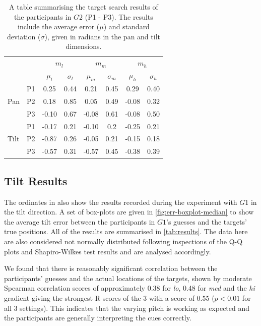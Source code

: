 \documentclass[sigconf, screen=true, anonymous=true]{acmart}
\begin{document}
\begin{table}
  \centering
  \caption{A table summarising the target search results of the participants in $G2$ (P1 - P3). The results include the average error ($\mu$) and standard deviation ($\sigma$), given in radians in the pan and tilt dimensions.}\label{tab:vi-results}
  \begin{tabular}{llcccccc}
    \toprule
    \multicolumn{2}{c}{} & \multicolumn{2}{c}{$m_l$} & \multicolumn{2}{c}{$m_m$} & \multicolumn{2}{c}{$m_h$} \\
    \multicolumn{2}{c}{} & $\mu_l$ & $\sigma_l$ & $\mu_m$ & $\sigma_m$ & $\mu_h$ & $\sigma_h$ \\\midrule
	 & P1 &  0.25 & 0.44 &  0.21 & 0.45 &  0.29 & 0.40 \\%
    Pan  & P2 &  0.18 & 0.85 &  0.05 & 0.49 & -0.08 & 0.32 \\%
	 & P3 & -0.10 & 0.67 & -0.08 & 0.61 & -0.08 & 0.50 \\ \midrule
	 & P1 & -0.17 & 0.21 & -0.10 & 0.2  & -0.25 & 0.21 \\%
    Tilt & P2 & -0.87 & 0.26 & -0.05 & 0.21 & -0.15 & 0.18 \\%
	 & P3 & -0.57 & 0.31 & -0.57 & 0.45 & -0.38 & 0.39 \\%
    \bottomrule
  \end{tabular}
\end{table}

\subsection{Tilt Results}\label{sec:tilt-results}

The ordinates in  also show the results recorded during the experiment with $G1$ in the tilt direction.
A set of box-plots are given in \cref{fig:err-boxplot-median} to show the average tilt error between the participants in $G1$'s guesses and the targets' true positions.
All of the results are summarised in \cref{tab:results}. 
The data here are also considered not normally distributed following inspections of the Q-Q plots and Shapiro-Wilkes test results and are analysed accordingly.

We found that there is reasonably significant correlation between the participants' guesses and the actual locations of the targets, shown by moderate Spearman correlation scores of approximately 0.38 for \emph{lo}, 0.48 for \emph{med} and the \emph{hi} gradient giving the strongest R-scores of the 3 with a score of 0.55 ($p < 0.01$ for all 3 settings).
This indicates that the varying pitch is working as expected and the participants are generally interpreting the cues correctly. 
\end{document}
